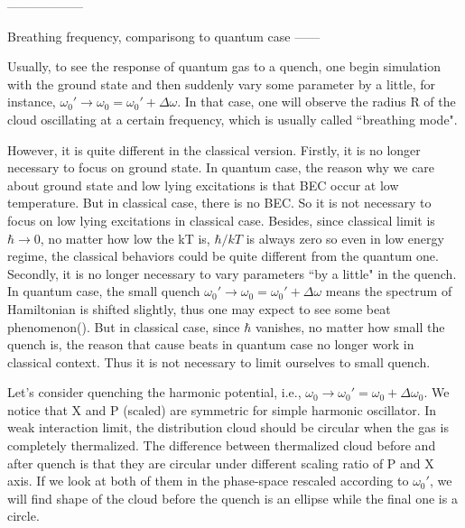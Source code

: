 \documentclass[onecolumn,pra]{revtex4-1}
\begin{document}


------------------

Breathing frequency, comparisong to quantum case ------ 

Usually, to see the response of quantum gas to a quench, one begin simulation with the ground state
and then suddenly vary some parameter by a little, for instance,
$\omega_0'\rightarrow\omega_0=\omega_0'+\Delta\omega$. In that case, one will observe the radius R
of the cloud oscillating at a certain frequency, which is usually called ``breathing mode".

However, it is quite different in the classical version. Firstly, it is no longer necessary to focus
on ground state. In quantum case, the reason why we care about ground state and low lying
excitations is that BEC occur at low temperature. But in classical case, there is no BEC. So it is
not necessary to focus on low lying excitations in classical case. Besides, since classical limit is
$\hbar\rightarrow 0$, no matter how low the kT is, $\hbar/kT$ is always zero so even in low energy
regime, the classical behaviors could be quite different from the quantum one. Secondly, it is no
longer necessary to vary parameters ``by a little" in the quench. In quantum case, the small quench
$\omega_0'\rightarrow\omega_0=\omega_0'+\Delta\omega$ means the spectrum of Hamiltonian is shifted
slightly, thus one may expect to see some beat phenomenon({\color{red}{?}}). But in classical case,
since $\hbar$ vanishes, no matter how small the quench is, the reason that cause beats in quantum
case no longer work in classical context. Thus it is not necessary to limit ourselves to small
quench.

Let's consider quenching the harmonic potential, i.e.,
$\omega_0\rightarrow\omega_0'=\omega_0+\Delta\omega_0$. We notice that X and P (scaled) are
symmetric for simple harmonic oscillator. In weak interaction limit, the distribution cloud should
be circular when the gas is completely thermalized. The difference between thermalized cloud before
and after quench is that they are circular under different scaling ratio of P and X axis. If we look
at both of them in the phase-space rescaled according to $\omega_0'$, we will find shape of the
cloud before the quench is an ellipse while the final one is a circle.
\end{document}
